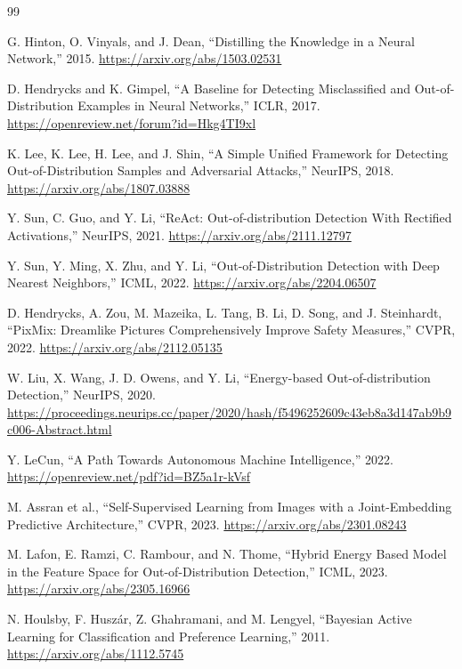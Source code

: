 \clearpage
\begin{thebibliography}{99}
\small

G. Hinton, O. Vinyals, and J. Dean,
``Distilling the Knowledge in a Neural Network,'' 2015.
\url{https://arxiv.org/abs/1503.02531}

D. Hendrycks and K. Gimpel,
``A Baseline for Detecting Misclassified and Out-of-Distribution Examples in
Neural Networks,'' ICLR, 2017.
\url{https://openreview.net/forum?id=Hkg4TI9xl}

K. Lee, K. Lee, H. Lee, and J. Shin,
``A Simple Unified Framework for Detecting Out-of-Distribution Samples and
Adversarial Attacks,'' NeurIPS, 2018.
\url{https://arxiv.org/abs/1807.03888}

Y. Sun, C. Guo, and Y. Li,
``ReAct: Out-of-distribution Detection With Rectified Activations,'' NeurIPS,
2021. \url{https://arxiv.org/abs/2111.12797}

Y. Sun, Y. Ming, X. Zhu, and Y. Li,
``Out-of-Distribution Detection with Deep Nearest Neighbors,'' ICML, 2022.
\url{https://arxiv.org/abs/2204.06507}

D. Hendrycks, A. Zou, M. Mazeika, L. Tang, B. Li, D. Song, and J. Steinhardt,
``PixMix: Dreamlike Pictures Comprehensively Improve Safety Measures,'' CVPR,
2022. \url{https://arxiv.org/abs/2112.05135}

W. Liu, X. Wang, J. D. Owens, and Y. Li,
``Energy-based Out-of-distribution Detection,'' NeurIPS, 2020.
\url{https://proceedings.neurips.cc/paper/2020/hash/f5496252609c43eb8a3d147ab9b9c006-Abstract.html}

Y. LeCun, ``A Path Towards Autonomous Machine Intelligence,'' 2022.
\url{https://openreview.net/pdf?id=BZ5a1r-kVsf}

M. Assran et al., ``Self-Supervised Learning from Images with a Joint-Embedding
Predictive Architecture,'' CVPR, 2023.
\url{https://arxiv.org/abs/2301.08243}

M. Lafon, E. Ramzi, C. Rambour, and N. Thome,
``Hybrid Energy Based Model in the Feature Space for Out-of-Distribution
Detection,'' ICML, 2023.
\url{https://arxiv.org/abs/2305.16966}

N. Houlsby, F. Husz\'ar, Z. Ghahramani, and M. Lengyel,
``Bayesian Active Learning for Classification and Preference Learning,'' 2011.
\url{https://arxiv.org/abs/1112.5745}


\end{thebibliography}
